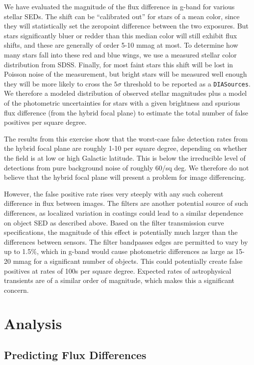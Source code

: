 \documentclass[12pt]{article}
\newcommand{\code}[1]{\texttt{#1}}
\newcommand{\DIASources}{\code{DIASources}\xspace}
\begin{document}
We have evaluated the magnitude of the flux difference in g-band for various
stellar SEDs. The shift can be ``calibrated out'' for stars of a mean color,
since they will statistically set the zeropoint difference between the two
exposures. But stars significantly bluer or redder than this median color will
still exhibit flux shifts, and these are generally of order 5-10 mmag at most.
To determine how many stars fall into these red and blue wings, we use a
measured stellar color distribution from SDSS. Finally, for most faint stars
this shift will be lost in Poisson noise of the measurement, but bright stars
will be measured well enough they will be more likely to cross the $5\sigma$
threshold to be reported as a \DIASources. We therefore a modeled distribution
of observed stellar magnitudes plus a model of the photometric uncertainties for
stars with a given brightness and spurious flux difference (from the hybrid focal
plane) to estimate the total number of false positives per square degree.

The results from this exercise show that the worst-case false detection rates
from the hybrid focal plane are roughly 1-10 per square degree, depending on
whether the field is at low or high Galactic latitude. This is below the
irreducible level of detections from pure background noise of roughly 60/sq deg.
We therefore do not believe that the hybrid focal plane will present a problem
for image differencing.

However, the false positive rate rises very steeply with any such coherent
difference in flux between images. The filters are another potential source of
such differences, as localized variation in coatings could lead to a similar
dependence on object SED as described above. Based on the filter transmission
curve specifications, the magnitude of this effect is potentially much larger
than the differences between sensors. The filter bandpasses edges are permitted to
vary by up to 1.5\%, which in g-band would cause photometric differences as
large as 15-20 mmag for a significant number of objects. This could potentially
create false positives at rates of 100s per square degree. Expected rates of
astrophysical transients are of a similar order of magnitude, which makes this a
significant concern.

\section{Analysis}

\subsection{Predicting Flux Differences}
\end{document}
